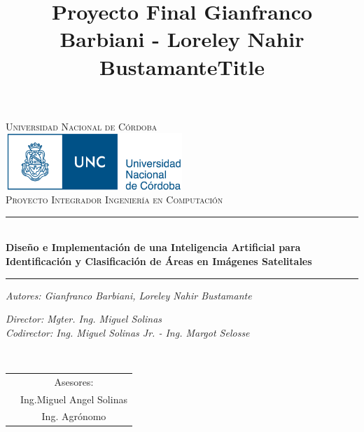 \documentclass[a4paper,openright,12pt]{report}
\title{Proyecto Final Gianfranco Barbiani - Loreley Nahir Bustamante}
\begin{document}

\begin{titlepage}
\begin{center}

\textsc{Universidad Nacional de Córdoba}\\[1.5cm] %

\includegraphics[width=0.5\textwidth]{logo_unc.pdf}~\\[1cm]

\textsc{\Large Proyecto Integrador Ingeniería en Computación }\\[0.5cm] %

\rule{1.5\textwidth}{.4pt} %
\title{Title }\\[0.4cm] %
\textbf{\Huge{Diseño e Implementación de una Inteligencia Artificial para Identificación y Clasificación de Áreas en Imágenes Satelitales}}
\rule{1.5\textwidth}{.4pt} %
 
\begin{minipage}{0.4\textwidth}
\begin{flushleft} \large
\emph{Autores: Gianfranco Barbiani, Loreley Nahir Bustamante}\\


\end{flushleft}
\end{minipage}
\begin{minipage}{0.4\textwidth}
\begin{flushright} \large
\emph{Director: Mgter. Ing. Miguel Solinas} \\
\emph{Codirector: Ing. Miguel Solinas Jr. - Ing. Margot Selosse} \\
 
\end{flushright}
\end{minipage}\\[1cm]

\begin{table}[H]
\centering
\label{my-label}
\begin{tabular}{cc}
           & Asesores:             \\
& Ing.Miguel Angel Solinas      \\
          & Ing. Agrónomo
\end{tabular}
\end{table}


\end{center}
\end{titlepage}
\end{document}
